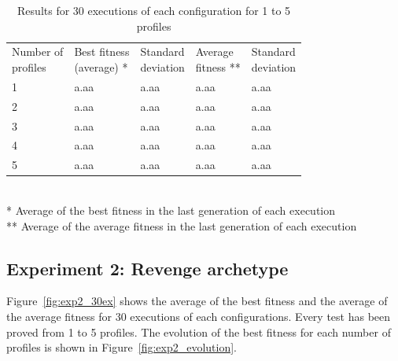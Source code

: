 \documentclass[runningheads]{llncs}
\begin{document}
\begin{table}
\begin{center}
\caption{Results for 30 executions of each configuration for 1 to 5 profiles}
\begin{tabular}{lllll}
\hline\noalign{\smallskip}
\parbox[t]{2cm}{Number of\\ profiles} 
& \parbox[t]{2cm}{Best fitness\\(average) *} 
& \parbox[t]{2cm}{Standard\\deviation}
& \parbox[t]{2cm}{Average\\fitness **}
& \parbox[t]{2cm}{Standard\\deviation}\\
\noalign{\smallskip}
\hline
\noalign{\smallskip}
1 & a.aa & a.aa & a.aa & a.aa \\
2 & a.aa & a.aa & a.aa & a.aa \\
3 & a.aa & a.aa & a.aa & a.aa \\
4 & a.aa & a.aa & a.aa & a.aa \\
5 & a.aa & a.aa & a.aa & a.aa \\
\hline
\end{tabular}
\\
\** Average of the best fitness in the last generation of each execution \\
\*** Average of the average fitness in the last generation of each execution \\
\end{center}
\label{fig:exp1_30ex}
\end{table}



\subsection{Experiment 2: Revenge archetype}


Figure~\ref{fig:exp2_30ex} shows the average of the best fitness and the average of the average fitness for 30 executions of each configurations. Every test has been proved from 1 to 5 profiles.
The evolution of the best fitness for each number of profiles is shown in Figure~\ref{fig:exp2_evolution}.
\end{document}
